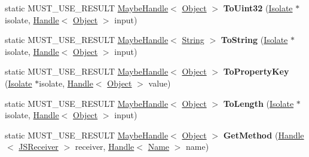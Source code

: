 \begin{DoxyCompactItemize}
\item 
static M\+U\+S\+T\+\_\+\+U\+S\+E\+\_\+\+R\+E\+S\+U\+LT \hyperlink{classv8_1_1internal_1_1_maybe_handle}{Maybe\+Handle}$<$ \hyperlink{classv8_1_1internal_1_1_object}{Object} $>$ {\bfseries To\+Uint32} (\hyperlink{classv8_1_1internal_1_1_isolate}{Isolate} $\ast$isolate, \hyperlink{classv8_1_1internal_1_1_handle}{Handle}$<$ \hyperlink{classv8_1_1internal_1_1_object}{Object} $>$ input)\hypertarget{classv8_1_1internal_1_1_object_acdd0c72fc73c44c65889d45847600e87}{}\label{classv8_1_1internal_1_1_object_acdd0c72fc73c44c65889d45847600e87}

\item 
static M\+U\+S\+T\+\_\+\+U\+S\+E\+\_\+\+R\+E\+S\+U\+LT \hyperlink{classv8_1_1internal_1_1_maybe_handle}{Maybe\+Handle}$<$ \hyperlink{classv8_1_1internal_1_1_string}{String} $>$ {\bfseries To\+String} (\hyperlink{classv8_1_1internal_1_1_isolate}{Isolate} $\ast$isolate, \hyperlink{classv8_1_1internal_1_1_handle}{Handle}$<$ \hyperlink{classv8_1_1internal_1_1_object}{Object} $>$ input)\hypertarget{classv8_1_1internal_1_1_object_ac3fd30862533d93e482df31b341197b8}{}\label{classv8_1_1internal_1_1_object_ac3fd30862533d93e482df31b341197b8}

\item 
static M\+U\+S\+T\+\_\+\+U\+S\+E\+\_\+\+R\+E\+S\+U\+LT \hyperlink{classv8_1_1internal_1_1_maybe_handle}{Maybe\+Handle}$<$ \hyperlink{classv8_1_1internal_1_1_object}{Object} $>$ {\bfseries To\+Property\+Key} (\hyperlink{classv8_1_1internal_1_1_isolate}{Isolate} $\ast$isolate, \hyperlink{classv8_1_1internal_1_1_handle}{Handle}$<$ \hyperlink{classv8_1_1internal_1_1_object}{Object} $>$ value)\hypertarget{classv8_1_1internal_1_1_object_af55bde149938c6ec42031e1cc83729df}{}\label{classv8_1_1internal_1_1_object_af55bde149938c6ec42031e1cc83729df}

\item 
static M\+U\+S\+T\+\_\+\+U\+S\+E\+\_\+\+R\+E\+S\+U\+LT \hyperlink{classv8_1_1internal_1_1_maybe_handle}{Maybe\+Handle}$<$ \hyperlink{classv8_1_1internal_1_1_object}{Object} $>$ {\bfseries To\+Length} (\hyperlink{classv8_1_1internal_1_1_isolate}{Isolate} $\ast$isolate, \hyperlink{classv8_1_1internal_1_1_handle}{Handle}$<$ \hyperlink{classv8_1_1internal_1_1_object}{Object} $>$ input)\hypertarget{classv8_1_1internal_1_1_object_ac268826b9aa2db691593e0c552fbd7c4}{}\label{classv8_1_1internal_1_1_object_ac268826b9aa2db691593e0c552fbd7c4}

\item 
static M\+U\+S\+T\+\_\+\+U\+S\+E\+\_\+\+R\+E\+S\+U\+LT \hyperlink{classv8_1_1internal_1_1_maybe_handle}{Maybe\+Handle}$<$ \hyperlink{classv8_1_1internal_1_1_object}{Object} $>$ {\bfseries Get\+Method} (\hyperlink{classv8_1_1internal_1_1_handle}{Handle}$<$ \hyperlink{classv8_1_1internal_1_1_j_s_receiver}{J\+S\+Receiver} $>$ receiver, \hyperlink{classv8_1_1internal_1_1_handle}{Handle}$<$ \hyperlink{classv8_1_1internal_1_1_name}{Name} $>$ name)\hypertarget{classv8_1_1internal_1_1_object_a697741f24647a730b743b088437c1ab7}{}\label{classv8_1_1internal_1_1_object_a697741f24647a730b743b088437c1ab7}


\end{DoxyCompactItemize}

